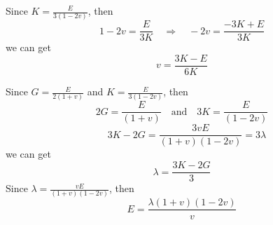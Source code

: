 \documentclass[onecolumn,oneside]{SUSTechHomework}
\begin{document}
  Since \( K = \frac{E}{3(1-2v)} \), then 
  \[
  1 - 2v = \frac{E}{3K} \quad \Rightarrow \quad -2v = \frac{-3K + E}{3K}
  \]
  we can get 
  \[
  v = \frac{3K - E}{6K}
  \]

  Since \( G = \frac{E}{2(1+v)} \) and \( K = \frac{E}{3(1-2v)} \), then 
  \[
  2G = \frac{E}{(1+v)} \quad \text{and} \quad 3K = \frac{E}{(1-2v)}
  \]
  \[
  \quad 3K - 2G = \frac{3vE}{(1+v)(1-2v)} = 3\lambda
  \]
  we can get 
  \[
  \lambda = \frac{3K - 2G}{3}
  \]
  Since \(\lambda = \frac{vE}{(1+v)(1-2v)}\), then
  \[
    E = \frac{\lambda(1+v)(1-2v)}{v}
  \]



\end{document}
